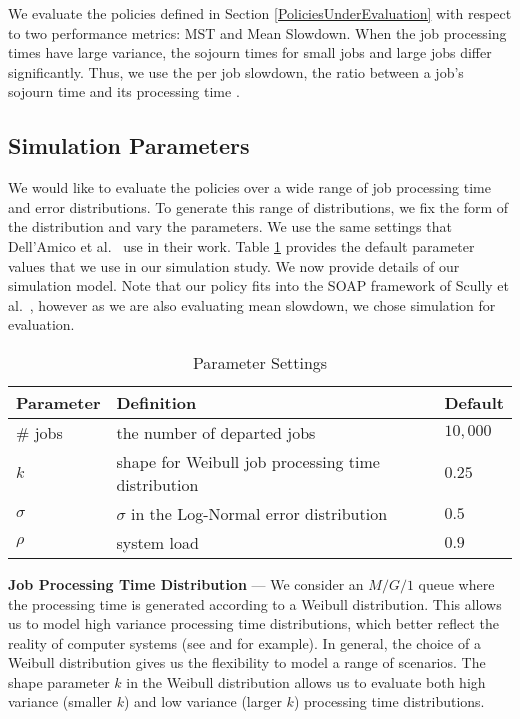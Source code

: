 We evaluate the policies defined in Section \ref{PoliciesUnderEvaluation} with respect to two performance metrics: MST and Mean Slowdown. When the job processing times have large variance, the sojourn times for small jobs and large jobs differ significantly. Thus, we use the per job slowdown, the ratio between a job's sojourn time and its processing time \cite{wierman2011fairness}.


\subsection{Simulation Parameters} \label{SimulationParameters}
We would like to evaluate the policies over a wide range of job processing time and error distributions. To generate this range of distributions, we fix the form of the distribution and vary the parameters. We use the same settings that Dell'Amico et al.\ \cite {dell2015psbs} use in their work. Table \ref{tab:1} provides the default parameter values that we use in our simulation study. We now provide details of our simulation model. Note that our policy fits into the SOAP framework of Scully et al.\ \cite{scully2018soap}, however as we are also evaluating mean slowdown, we chose simulation for evaluation.\\



\begin{table}[t]
\centering
\caption{Parameter Settings}
\begin{tabular}{ |p{2.2cm}|p{7cm}|p{2cm}|  }
 \hline

 \hline
 \textbf{Parameter} & \textbf{Definition} &\textbf{Default} \\
 \hline
 \# jobs   & the number of departed jobs     &$10,000$ \\ 
 $k$&   shape for Weibull job processing time distribution  & $0.25$   \\
 $\sigma$ & $\sigma$ in the Log-Normal error distribution & $0.5$ \\
 $\rho$ &   system load   & $0.9$ \\

 \hline

\end{tabular}

\label{tab:1}
\end{table}




\textbf{Job Processing Time Distribution} ---  We consider an $M/G/1$ queue where the processing time is generated according to a Weibull distribution. This allows us to model high variance processing time distributions, which better reflect the reality of computer systems (see \cite{crovella1998heavy} and \cite{harchol1999ect} for example).  In general, the choice of a Weibull distribution gives us the flexibility to model a range of scenarios. The shape parameter $k$ in the Weibull distribution allows us to evaluate both high variance (smaller $k$) and low variance (larger $k$) processing time distributions.  

